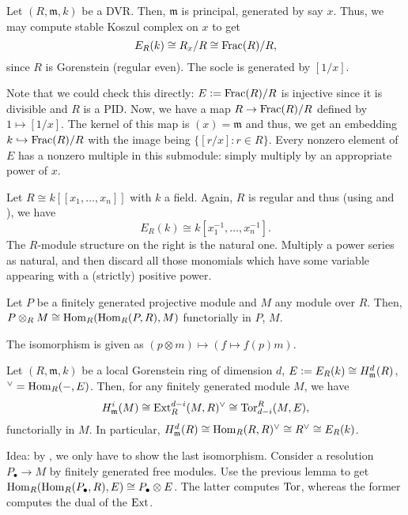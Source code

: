 \documentclass[12pt]{article}
\begin{document}
\begin{ex}
	Let $(R, \mathfrak{m}, k)$ be a DVR. Then, $\mathfrak{m}$ is principal, generated by say $x$. Thus, we may compute stable Koszul complex on $x$ to get
	\begin{equation*} 
		E_{R}(k) \cong R_{x}/R \cong \operatorname{Frac}(R)/R,
	\end{equation*}
	since $R$ is Gorenstein (regular even). The socle is generated by $[1/x]$.

	Note that we could check this directly: $E \vcentcolon= \operatorname{Frac}(R)/R$ is injective since it is divisible and $R$ is a PID. Now, we have a map $R \to \operatorname{Frac}(R)/R$ defined by $1 \mapsto [1/x]$. \newline
	The kernel of this map is $(x) = \mathfrak{m}$ and thus, we get an embedding $k \hookrightarrow \operatorname{Frac}(R)/R$ with the image being $\{[r/x] : r \in R\}$. Every nonzero element of $E$ has a nonzero multiple in this submodule: simply multiply by an appropriate power of $x$.
\end{ex}

\begin{ex}
	Let $R \cong k[\![x_{1}, \ldots, x_{n}]\!]$ with $k$ a field. Again, $R$ is regular and thus (using  and ), we have
	\begin{equation*} 
		E_{R}(k) \cong k[x_{1}^{-1}, \ldots, x_{n}^{-1}].
	\end{equation*}
	The $R$-module structure on the right is the natural one. Multiply a power series as natural, and then discard all those monomials which have some variable appearing with a (strictly) positive power.
\end{ex}

\begin{lem} 
	Let $P$ be a finitely generated projective module and $M$ any module over $R$. Then, $P \otimes_{R} M \cong \operatorname{Hom}_{R}(\operatorname{Hom}_{R}(P, R), M)$ functorially in $P$, $M$.
\end{lem}
The isomorphism is given as $(p \otimes m) \mapsto (f \mapsto f(p) m)$.

\begin{thm} \label{thm:local-duality-gorenstein}
	Let $(R, \mathfrak{m}, k)$ be a local Gorenstein ring of dimension $d$, $E \vcentcolon= E_{R}(k) \cong H_{\mathfrak{m}}^{d}(R)$, $^{\vee} = \operatorname{Hom}_{R}(-, E)$. \newline
	Then, for any finitely generated module $M$, we have
	\begin{equation*} 
		H_{\mathfrak{m}}^{i}(M) \cong \operatorname{Ext}_{R}^{d - i}(M, R)^{\vee} \cong \operatorname{Tor}^{R}_{d - i}(M, E),
	\end{equation*}
	functorially in $M$. In particular, $H_{\mathfrak{m}}^{d}(R) \cong \operatorname{Hom}_{R}(R, R)^{\vee} \cong R^{\vee} \cong E_{R}(k)$.
\end{thm}
Idea: by , we only have to show the last isomorphism. Consider a resolution $P_{\bullet} \to M$ by finitely generated free modules. Use the previous lemma to get $\operatorname{Hom}_{R}(\operatorname{Hom}_{R}(P_{\bullet}, R), E) \cong P_{\bullet} \otimes E$. The latter computes $\operatorname{Tor}$, whereas the former computes the dual of the $\operatorname{Ext}$.
\end{document}
